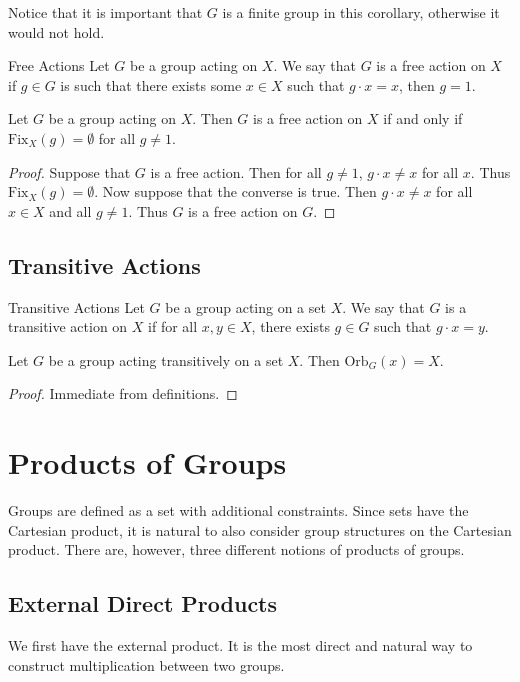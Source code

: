\documentclass[a4paper]{article}
\begin{document}
Notice that it is important that $G$ is a finite group in this corollary, otherwise it would not hold. 

\begin{defn}{Free Actions}{} Let $G$ be a group acting on $X$. We say that $G$ is a free action on $X$ if $g\in G$ is such that there exists some $x\in X$ such that $g\cdot x=x$, then $g=1$. 
\end{defn}

\begin{lmm}{}{} Let $G$ be a group acting on $X$. Then $G$ is a free action on $X$ if and only if $\text{Fix}_X(g)=\emptyset$ for all $g\neq 1$. \tcbline
\begin{proof}
Suppose that $G$ is a free action. Then for all $g\neq 1$, $g\cdot x\neq x$ for all $x$. Thus $\text{Fix}_X(g)=\emptyset$. Now suppose that the converse is true. Then $g\cdot x\neq x$ for all $x\in X$ and all $g\neq 1$. Thus $G$ is a free action on $G$. 
\end{proof}
\end{lmm}

\subsection{Transitive Actions}
\begin{defn}{Transitive Actions}{} Let $G$ be a group acting on a set $X$. We say that $G$ is a transitive action on $X$ if for all $x,y\in X$, there exists $g\in G$ such that $g\cdot x=y$. 
\end{defn}

\begin{lmm}{}{} Let $G$ be a group acting transitively on a set $X$. Then $\text{Orb}_G(x)=X$. \tcbline
\begin{proof}
Immediate from definitions. 
\end{proof}
\end{lmm}

\pagebreak
\section{Products of Groups}
Groups are defined as a set with additional constraints. Since sets have the Cartesian product, it is natural to also consider group structures on the Cartesian product. There are, however, three different notions of products of groups. 

\subsection{External Direct Products}
We first have the external product. It is the most direct and natural way to construct multiplication between two groups. 
\end{document}
